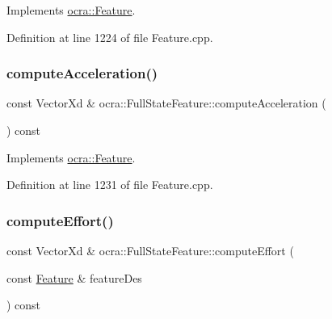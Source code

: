 Implements \hyperlink{classocra_1_1Feature_a4a5973d27459d2dececec8dc73038df8}{ocra\+::\+Feature}.



Definition at line 1224 of file Feature.\+cpp.

\hypertarget{classocra_1_1FullStateFeature_a7e668c7fa50e2ee6947c2f97dcd18e4e}{}\label{classocra_1_1FullStateFeature_a7e668c7fa50e2ee6947c2f97dcd18e4e} 
\subsubsection{\texorpdfstring{compute\+Acceleration()}{computeAcceleration()}\hspace{0.1cm}{\footnotesize\ttfamily [2/2]}}
{\footnotesize\ttfamily const Vector\+Xd \& ocra\+::\+Full\+State\+Feature\+::compute\+Acceleration (\begin{DoxyParamCaption}{ }\end{DoxyParamCaption}) const\hspace{0.3cm}{\ttfamily [virtual]}}



Implements \hyperlink{classocra_1_1Feature_aa42b61d4255116caa92042d01ca36b79}{ocra\+::\+Feature}.



Definition at line 1231 of file Feature.\+cpp.

\hypertarget{classocra_1_1FullStateFeature_aac81e14af36ee0fb2ff24f991a1915eb}{}\label{classocra_1_1FullStateFeature_aac81e14af36ee0fb2ff24f991a1915eb} 
\subsubsection{\texorpdfstring{compute\+Effort()}{computeEffort()}\hspace{0.1cm}{\footnotesize\ttfamily [1/2]}}
{\footnotesize\ttfamily const Vector\+Xd \& ocra\+::\+Full\+State\+Feature\+::compute\+Effort (\begin{DoxyParamCaption}\item[{const \hyperlink{classocra_1_1Feature}{Feature} \&}]{feature\+Des }\end{DoxyParamCaption}) const\hspace{0.3cm}{\ttfamily [virtual]}}



